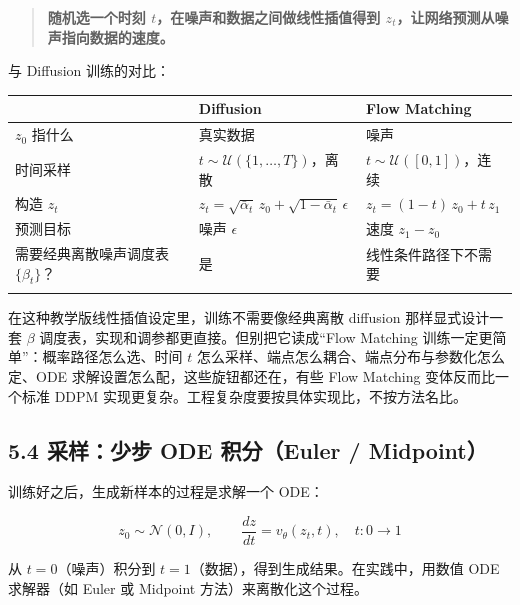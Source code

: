 \documentclass[
  chinese,
]{ctexart}
\begin{document}
\begin{quote}
\textbf{随机选一个时刻 \(t\)，在噪声和数据之间做线性插值得到
\(z_t\)，让网络预测从噪声指向数据的速度。}
\end{quote}

与 Diffusion 训练的对比：

\begin{center}
\begin{tabular}{@{}>{\raggedright\arraybackslash}p{} >{\raggedright\arraybackslash}p{} >{\raggedright\arraybackslash}p{}@{}}
\toprule\noalign{}
 & Diffusion & Flow Matching \\
\midrule\noalign{}
\(z_0\) 指什么 & 真实数据 & 噪声 \\
时间采样 & \(t \sim \mathcal{U}(\{1, \ldots, T\})\)，离散 & \(t \sim \mathcal{U}([0, 1])\)，连续 \\
构造 \(z_t\) & \(z_t = \sqrt{\bar{\alpha}_t}\, z_0 + \sqrt{1-\bar{\alpha}_t}\, \epsilon\) & \(z_t = (1-t)\, z_0 + t\, z_1\) \\
预测目标 & 噪声 \(\epsilon\) & 速度 \(z_1 - z_0\) \\
需要经典离散噪声调度表 \(\{\beta_t\}\)？ & 是 & 线性条件路径下不需要 \\
\bottomrule\noalign{}
\end{tabular}
\end{center}

在这种教学版线性插值设定里，训练不需要像经典离散 diffusion
那样显式设计一套 \(\beta\)
调度表，实现和调参都更直接。但别把它读成``Flow Matching
训练一定更简单''：概率路径怎么选、时间 \(t\)
怎么采样、端点怎么耦合、端点分布与参数化怎么定、ODE
求解设置怎么配，这些旋钮都还在，有些 Flow Matching 变体反而比一个标准
DDPM 实现更复杂。工程复杂度要按具体实现比，不按方法名比。

\subsection{5.4 采样：少步 ODE 积分（Euler /
Midpoint）}\label{ux91c7ux6837ux5c11ux6b65-ode-ux79efux5206euler-midpoint}

训练好之后，生成新样本的过程是求解一个 ODE：

\[
z_0 \sim \mathcal{N}(0, I), \qquad \frac{dz}{dt} = v_\theta(z_t, t), \quad t: 0 \to 1
\]

从 \(t=0\)（噪声）积分到 \(t=1\)（数据），得到生成结果。在实践中，用数值
ODE 求解器（如 Euler 或 Midpoint 方法）来离散化这个过程。
\end{document}
